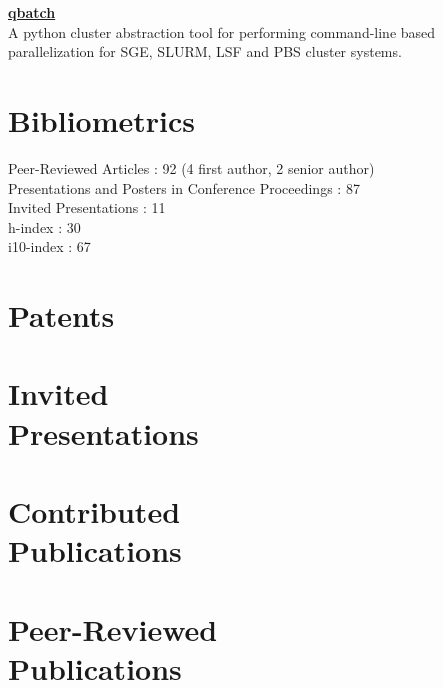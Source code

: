 \documentclass[margin1,line,canadian]{resume}
\begin{document}
\begin{resume}
\textbf{\href{https://github.com/CoBrALab/qbatch}{\color{black}qbatch}}\\%
A python cluster abstraction tool for performing command-line based parallelization for SGE, SLURM, LSF and PBS cluster systems.

\section{\mysidestyle{}Bibliometrics}
Peer-Reviewed Articles : 92 (4 first author, 2 senior author)\\
Presentations and Posters in Conference Proceedings : 87\\
Invited Presentations : 11\\
h-index : 30\\
i10-index : 67

 \section{\mysidestyle{}Patents}
 \begin{refsection}
  \newrefcontext[sorting=ymdnt]
  \nocite{*}
  \printbibliography[heading=none]
 \end{refsection}
 \section{\mysidestyle{}Invited\\Presentations}
 \begin{refsection}
  \newrefcontext[sorting=ymdnt]
  \nocite{*}
  \printbibliography[heading=none]
 \end{refsection}
 \section{\mysidestyle{}Contributed\\Publications}
 \begin{refsection}
  \newrefcontext[sorting=ymdnt]
  \nocite{*}
  \printbibliography[heading=none]
 \end{refsection}
 \section{\mysidestyle{}Peer-Reviewed\\Publications}
 \begin{refsection}
  \newrefcontext[sorting=ymdnt]
  \nocite{*}
  \printbibliography[heading=none]
 \end{refsection}

\end{resume}
\end{document}
